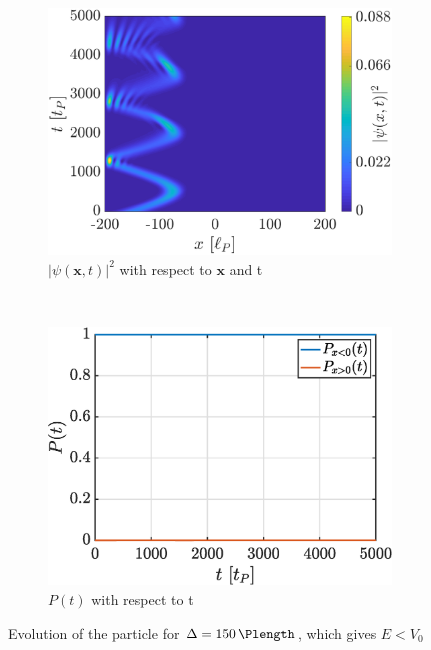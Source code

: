\documentclass[a4paper,12pt,twoside]{article}
\newcommand{\mbf}[1]{\mathbf{#1}} %
\begin{document}
    \begin{figure}[h]
      \centering
      \begin{subfigure}[t]{0.45\textwidth}
        \includegraphics[width=\textwidth]{graphs/iii_evo_Eleqv0_evo.eps}
        \caption{$|\psi(\mbf{x}, t)|^2$ with respect to $\mbf{x}$ and t}
        \label{fig:iii_evo_Eleqv0_evo}
      \end{subfigure}
      ~
      \begin{subfigure}[t]{0.45\textwidth}
        \includegraphics[width=\textwidth]{graphs/iii_evo_Eleqv0_prob.eps}
        \caption{$P(t)$ with respect to t}
        \label{fig:iii_evo_Eleqv0_prob}
      \end{subfigure}
      \caption{Evolution of the particle for $\Delta = \SI{150}{\Plength}$, which gives $E < V_0$}
      \label{fig:iii_evo_Eleqv0}
    \end{figure}
\end{document}
